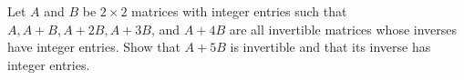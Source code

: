 Let $A$ and $B$ be $2 \times 2$ matrices with integer entries such
that $A, A+B, A+2B, A+3B$, and $A+4B$ are all invertible matrices whose
inverses have integer entries. Show that $A+5B$ is invertible and that
its inverse has integer entries.
